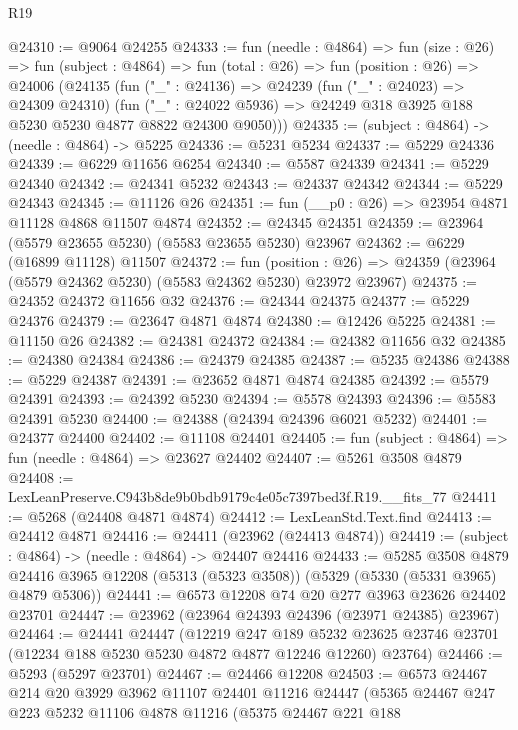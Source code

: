 \begin{lexlean}{R19}
\begin{coremodule}
@24310 := @9064 @24255
@24333 := fun (needle : @4864) =>
  fun (size : @26) =>
  fun (subject : @4864) =>
  fun (total : @26) =>
  fun (position : @26) =>
  @24006
    (@24135
      (fun ("_" : @24136) =>
      @24239
        (fun ("_" : @24023) => @24309 @24310)
        (fun ("_" : @24022 @5936) => @24249 @318 @3925 @188 @5230 @5230 @4877 @8822 @24300 @9050)))
@24335 := (subject : @4864) -> (needle : @4864) -> @5225
@24336 := @5231 @5234
@24337 := @5229 @24336
@24339 := @6229 @11656 @6254
@24340 := @5587 @24339
@24341 := @5229 @24340
@24342 := @24341 @5232
@24343 := @24337 @24342
@24344 := @5229 @24343
@24345 := @11126 @26
@24351 := fun (__p0 : @26) => @23954 @4871 @11128 @4868 @11507 @4874
@24352 := @24345 @24351
@24359 := @23964 (@5579 @23655 @5230) (@5583 @23655 @5230) @23967
@24362 := @6229 (@16899 @11128) @11507
@24372 := fun (position : @26) =>
  @24359 (@23964 (@5579 @24362 @5230) (@5583 @24362 @5230) @23972 @23967)
@24375 := @24352 @24372 @11656 @32
@24376 := @24344 @24375
@24377 := @5229 @24376
@24379 := @23647 @4871 @4874
@24380 := @12426 @5225
@24381 := @11150 @26
@24382 := @24381 @24372
@24384 := @24382 @11656 @32
@24385 := @24380 @24384
@24386 := @24379 @24385
@24387 := @5235 @24386
@24388 := @5229 @24387
@24391 := @23652 @4871 @4874 @24385
@24392 := @5579 @24391
@24393 := @24392 @5230
@24394 := @5578 @24393
@24396 := @5583 @24391 @5230
@24400 := @24388 (@24394 @24396 @6021 @5232)
@24401 := @24377 @24400
@24402 := @11108 @24401
@24405 := fun (subject : @4864) => fun (needle : @4864) => @23627 @24402
@24407 := @5261 @3508 @4879
@24408 := LexLeanPreserve.C943b8de9b0bdb9179c4e05c7397bed3f.R19.__fits_77
@24411 := @5268 (@24408 @4871 @4874)
@24412 := LexLeanStd.Text.find
@24413 := @24412 @4871
@24416 := @24411 (@23962 (@24413 @4874))
@24419 := (subject : @4864) -> (needle : @4864) -> @24407 @24416
@24433 := @5285
    @3508
    @4879
    @24416
    @3965
    @12208
    (@5313 (@5323 @3508))
    (@5329 (@5330 (@5331 @3965) @4879 @5306))
@24441 := @6573 @12208 @74 @20 @277 @3963 @23626 @24402 @23701
@24447 := @23962 (@23964 @24393 @24396 (@23971 @24385) @23967)
@24464 := @24441
    @24447
    (@12219
      @247
      @189
      @5232
      @23625
      @23746
      @23701
      (@12234 @188 @5230 @5230 @4872 @4877 @12246 @12260)
      @23764)
@24466 := @5293 (@5297 @23701)
@24467 := @24466 @12208
@24503 := @6573
    @24467
    @214
    @20
    @3929
    @3962
    @11107
    @24401
    @11216
    @24447
    (@5365
      @24467
      @247
      @223
      @5232
      @11106
      @4878
      @11216
      (@5375
        @24467
        @221
        @188

\end{coremodule}
\end{lexlean}
